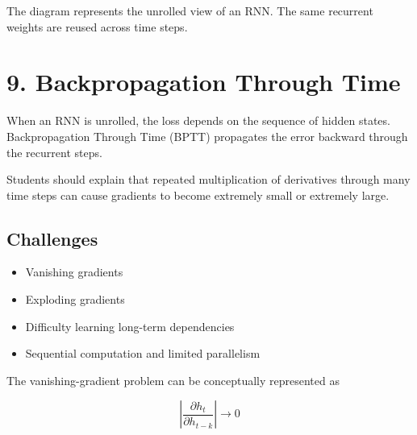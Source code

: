 \documentclass[10pt]{article}
\begin{document}
The diagram represents the unrolled view of an RNN. The same recurrent weights
are reused across time steps.

\section*{9. Backpropagation Through Time}

When an RNN is unrolled, the loss depends on the sequence of hidden states.
Backpropagation Through Time (BPTT) propagates the error backward through
the recurrent steps.

\begin{center}
\end{center}

Students should explain that repeated multiplication of derivatives through
many time steps can cause gradients to become extremely small or extremely
large.

\subsection*{Challenges}

\begin{itemize}
\item Vanishing gradients
\item Exploding gradients
\item Difficulty learning long-term dependencies
\item Sequential computation and limited parallelism
\end{itemize}

The vanishing-gradient problem can be conceptually represented as

\[
\left|\frac{\partial h_t}{\partial h_{t-k}}\right|\rightarrow0
\]
\end{document}
